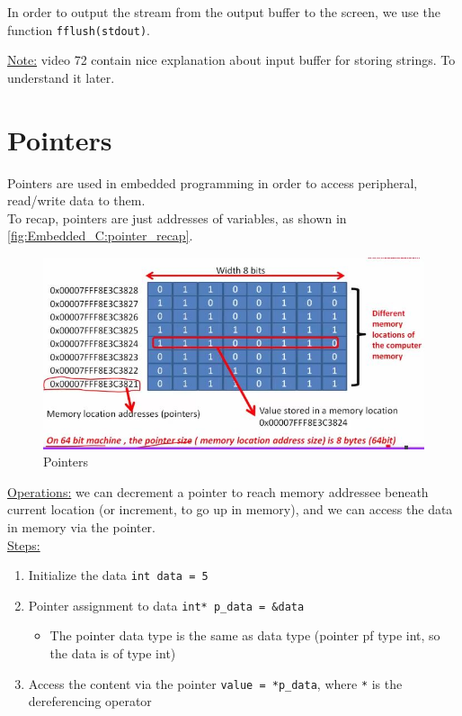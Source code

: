 In order to output the stream from the output buffer to the screen, we use the function \verb|fflush(stdout)|.

\underline{Note:} video 72 contain nice explanation about input buffer for storing strings. To understand it later.


\newpage
\section{Pointers}

Pointers are used in embedded programming in order to access peripheral, read/write data to them.\\

To recap, pointers are just addresses of variables, as shown in \autoref{fig:Embedded_C:pointer_recap}.


\begin{figure}[h]
\centering
\includegraphics[scale=0.5]{Figures/Embedded_C/pointer_recap}
\caption{Pointers}
\label{fig:Embedded_C:pointer_recap}
\end{figure} 

\underline{Operations:} we can decrement a pointer to reach memory addressee beneath current location (or increment, to go up in memory), and we can access the data in memory via the pointer.\\

\underline{Steps:}

\begin{enumerate}
    \item Initialize the data \verb|int data = 5|
    
    \item Pointer assignment to data \verb|int* p_data = &data|
    
    \begin{itemize}
        \item The pointer data type is the same as data type (pointer pf type int, so the data is of type int)
    \end{itemize}
    
    \item Access the content via the pointer \verb|value = *p_data|, where \verb|*| is the dereferencing operator
    
\end{enumerate}

